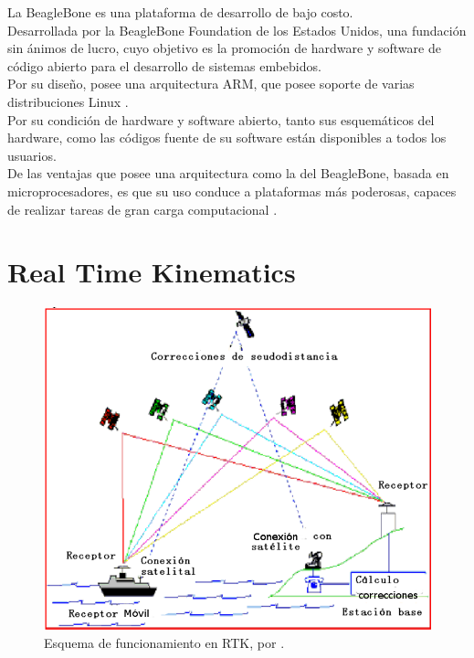 
La BeagleBone es una plataforma de desarrollo de bajo costo. \\

Desarrollada por la BeagleBone Foundation de los Estados Unidos, una fundación sin ánimos de lucro, cuyo objetivo es la promoción de hardware y software de código abierto para el desarrollo de sistemas embebidos. \\

Por su diseño, posee una arquitectura ARM, que posee soporte de varias distribuciones Linux \cite{coronado2014desarrollo}. \\

Por su condición de hardware y software abierto, tanto sus esquemáticos del hardware, como las códigos fuente de su software están disponibles a todos los usuarios. \\

De las ventajas que posee una arquitectura como la del BeagleBone, basada en microprocesadores, es que su uso conduce a plataformas más poderosas, capaces de realizar tareas de gran carga computacional \cite{coley2013beaglebone}.

\section{Real Time Kinematics}

\begin{figure}[ht]
\centering
\includegraphics[scale=0.30]{Figures/DGPS1}
\caption[Esquema de funcionamiento en RTK.]{Esquema de funcionamiento en RTK, por \cite{fallas2002sistema}.}
\label{fig:RTK}
\end{figure}

